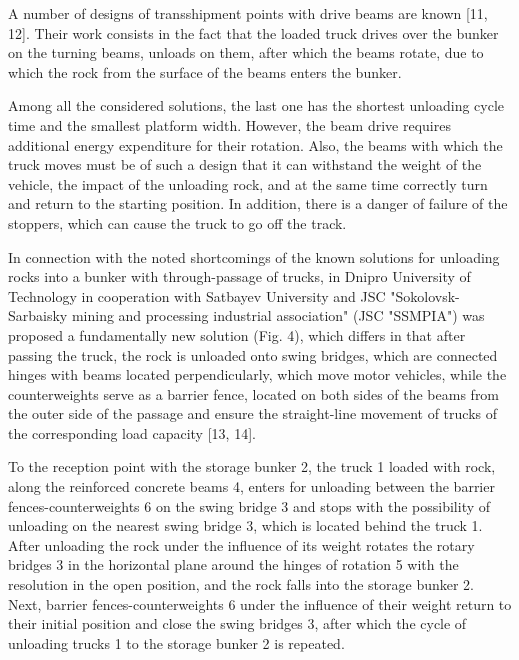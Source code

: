 A number of designs of transshipment points with drive beams are known
{[}11, 12{]}. Their work consists in the fact that the loaded truck
drives over the bunker on the turning beams, unloads on them, after
which the beams rotate, due to which the rock from the surface of the
beams enters the bunker.

Among all the considered solutions, the last one has the shortest
unloading cycle time and the smallest platform width. However, the beam
drive requires additional energy expenditure for their rotation. Also,
the beams with which the truck moves must be of such a design that it
can withstand the weight of the vehicle, the impact of the unloading
rock, and at the same time correctly turn and return to the starting
position. In addition, there is a danger of failure of the stoppers,
which can cause the truck to go off the track.

In connection with the noted shortcomings of the known solutions for
unloading rocks into a bunker with through-passage of trucks, in Dnipro
University of Technology in cooperation with Satbayev University and JSC
"Sokolovsk-Sarbaisky mining and processing industrial association" (JSC
"SSMPIA") was proposed a fundamentally new solution (Fig. 4), which
differs in that after passing the truck, the rock is unloaded onto swing
bridges, which are connected hinges with beams located perpendicularly,
which move motor vehicles, while the counterweights serve as a barrier
fence, located on both sides of the beams from the outer side of the
passage and ensure the straight-line movement of trucks of the
corresponding load capacity {[}13, 14{]}.

To the reception point with the storage bunker 2, the truck 1 loaded
with rock, along the reinforced concrete beams 4, enters for unloading
between the barrier fences-counterweights 6 on the swing bridge 3 and
stops with the possibility of unloading on the nearest swing bridge 3,
which is located behind the truck 1. After unloading the rock under the
influence of its weight rotates the rotary bridges 3 in the horizontal
plane around the hinges of rotation 5 with the resolution in the open
position, and the rock falls into the storage bunker 2. Next, barrier
fences-counterweights 6 under the influence of their weight return to
their initial position and close the swing bridges 3, after which the
cycle of unloading trucks 1 to the storage bunker 2 is repeated.

